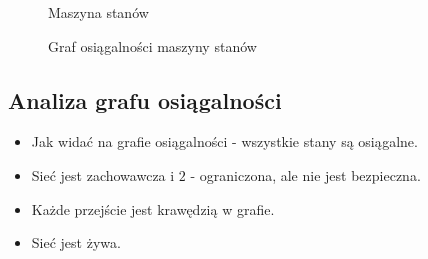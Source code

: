 \begin{figure}[h!]
	\caption{Maszyna stanów}
	\label{zad2:graph1}
\end{figure}

\begin{figure}[h!]
	\caption{Graf osiągalności maszyny stanów}
	\label{zad2:graph1}
\end{figure}

\subsection{Analiza grafu osiągalności}
\begin{itemize}
	\item Jak widać na grafie osiągalności - wszystkie stany są osiągalne.
	\item Sieć jest zachowawcza i $2$ - ograniczona, ale nie jest bezpieczna.
	\item Każde przejście jest krawędzią w grafie.
	\item Sieć jest żywa.
\end{itemize}


